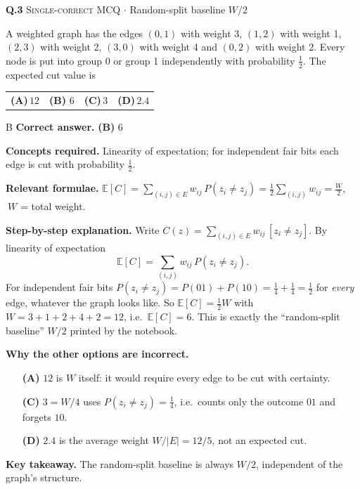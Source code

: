 \documentclass[11pt,a4paper]{article}
\newcommand{\optlabel}[1]{\textbf{(#1)}}
\newcommand{\correctlabel}[1]{\textcolor{okgreen}{\textbf{(#1)}\,\ding{51}}}
\newenvironment{qitem}[1]{\begin{list}{}{\setlength{\leftmargin}{3.3em}\setlength{\labelwidth}{3.1em}%
  \setlength{\labelsep}{0.2em}\setlength{\topsep}{3pt}\setlength{\parsep}{3pt}}\item[\textbf{Q.#1}\hfill]}{\end{list}}
\newcommand{\qsep}{\par\vspace{2pt}{\color{black!15}\hrule}\vspace{4pt}}
\newcommand{\qmeta}[2]{{\footnotesize\color{black!60}\textsc{#1} \;$\cdot$\; #2}\par}
\begin{document}
\begin{qitem}{3}
\qmeta{Single-correct MCQ}{Random-split baseline $W/2$}
A weighted graph has the edges $(0,1)$ with weight 3, $(1,2)$ with weight 1, $(2,3)$ with weight 2, $(3,0)$ with
weight 4 and $(0,2)$ with weight 2. Every node is put into group 0 or group 1 independently with probability $\tfrac12$.
The expected cut value is
\par\smallskip\noindent\begin{tabularx}{\linewidth}{@{}*{4}{L}@{}}
\optlabel{A}\,$12$ & \correctlabel{B}\,$6$ & \optlabel{C}\,$3$ & \optlabel{D}\,$2.4$
\end{tabularx}
\end{qitem}
\begin{solbox}{B}
\textbf{\color{brand}Correct answer.} \textcolor{okgreen}{\textbf{(B)}} $6$

\textbf{\color{brand}Concepts required.} Linearity of expectation; for independent fair bits each edge is cut with probability $\frac12$.

\textbf{\color{brand}Relevant formulae.} $\mathbb E[C] = \sum_{(i,j)\in E} w_{ij}\,P(z_i\neq z_j) = \tfrac12\sum_{(i,j)} w_{ij} = \tfrac W2$, $\ W$ = total weight.

\textbf{\color{brand}Step-by-step explanation.} Write $C(z) = \sum_{(i,j)\in E} w_{ij}\,[z_i \neq z_j]$. By linearity of expectation
\[ \mathbb{E}[C] = \sum_{(i,j)} w_{ij}\,P(z_i \neq z_j). \]
For independent fair bits $P(z_i \neq z_j) = P(01) + P(10) = \tfrac14 + \tfrac14 = \tfrac12$ for \emph{every} edge, whatever the graph looks like.
So $\mathbb{E}[C] = \tfrac12 W$ with $W = 3 + 1 + 2 + 4 + 2 = 12$, i.e.\ $\mathbb{E}[C] = 6$. This is exactly the
``random-split baseline'' $W/2$ printed by the notebook.

\textbf{\color{brand}Why the other options are incorrect.}
\begin{itemize}[leftmargin=2.4em, itemsep=1pt, topsep=2pt]
\item[\textbf{(A)}] $12$ is $W$ itself: it would require every edge to be cut with certainty.
\item[\textbf{(C)}] $3 = W/4$ uses $P(z_i\neq z_j) = \frac14$, i.e.\ counts only the outcome $01$ and forgets $10$.
\item[\textbf{(D)}] $2.4$ is the average weight $W/|E| = 12/5$, not an expected cut.
\end{itemize}
\textbf{\color{brand}Key takeaway.} The random-split baseline is always $W/2$, independent of the graph's structure.
\end{solbox}
\qsep
\end{document}
